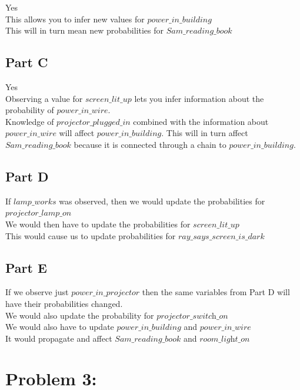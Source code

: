 \documentclass[twoside,11pt]{article}
\theoremstyle{definition}
\begin{document}
Yes\\
This allows you to infer new values for $\textit{power\_in\_building}$\\
This will in turn mean new probabilities for $\textit{Sam\_reading\_book}$\\

\subsection*{Part C}

Yes\\
Observing a value for $\textit{screen\_lit\_up}$ lets you infer information about the probability of $\textit{power\_in\_wire}$. \\
Knowledge of $\textit{projector\_plugged\_in}$ combined with the information about $\textit{power\_in\_wire}$ will affect $\textit{power\_in\_building}$. This will in turn affect  $\textit{Sam\_reading\_book}$ because it is connected through a chain to $\textit{power\_in\_building}$.

\subsection*{Part D}

If $\textit{lamp\_works}$ was observed, then we would update the probabilities for $\textit{projector\_lamp\_on}$\\
We would then have to update the probabilities for $\textit{screen\_lit\_up}$\\
This would cause us to update probabilities for $\textit{ray\_says\_screen\_is\_dark}$\\

\subsection*{Part E}

If we observe just $\textit{power\_in\_projector}$ then the same variables from Part D will have their probabilities changed.\\
We would also update the probability for $\textit{projector\_switch\_on}$\\
We would also have to update $\textit{power\_in\_building}$ and $\textit{power\_in\_wire}$\\
It would propagate and affect $\textit{Sam\_reading\_book}$ and $\textit{room\_light\_on}$


\newpage

\section*{Problem 3: }
\end{document}

